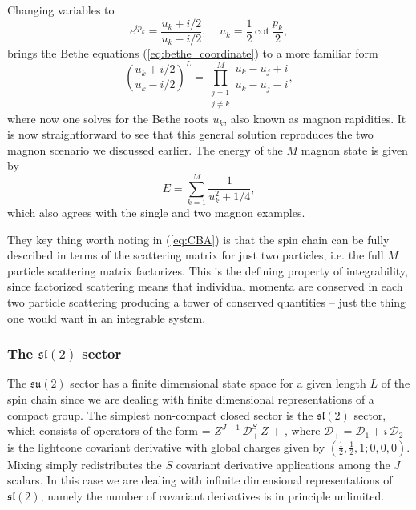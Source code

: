 Changing variables to
\begin{equation}
	\label{eq:up_param}
	e^{ip_k} = \frac{u_k + i/2}{u_k - i/2}, \;\;\;\; u_k = \frac{1}{2} \, \mathrm{cot} \, \frac{p_k}{2},
\end{equation}
brings the Bethe equations (\ref{eq:bethe_coordinate}) to a more familiar form
\begin{equation}
	\label{eq:su2_bae}
	\left( \frac{u_k + i/2}{u_k - i/2} \right)^L = \prod_{\substack{j=1 \\ j \neq k}}^M \frac{u_k - u_j + i}{u_k - u_j - i},
\end{equation}
where now one solves for the Bethe roots $u_k$, also known as magnon rapidities. 
It is now straightforward to see that this general solution reproduces the two magnon scenario we discussed earlier. 
The energy of the $M$ magnon state is given by
\begin{equation}
	E = \sum_{k=1}^M \frac{1}{u_k^2 + 1/4},
\end{equation}
 which also agrees with the single and two magnon examples. 
 
They key thing worth noting in (\ref{eq:CBA}) is that the spin chain can be fully described in terms of the scattering matrix for just two particles, i.e. the full $M$ particle scattering matrix factorizes.
This is the defining property of integrability, since factorized scattering means that individual momenta are conserved in each two particle scattering producing a tower of conserved quantities -- just the thing one would want in an integrable system. 
 
\subsubsection{The $\mathfrak{sl}(2)$ sector}
\label{sec:sl2_sector}

The $\mathfrak{su}(2)$ sector has a finite dimensional state space for a given length $L$ of the spin chain since we are dealing with finite dimensional representations of a compact group.
The simplest non-compact closed sector is the $\mathfrak{sl}(2)$ sector, which consists of operators of the form \cite{Beisert:2003yb}
\beq
	\label{eq:sl2_operators}
	 = \tr \( Z^{J-1} \, \mathcal{D}_+^S \, Z \) + ,
\eeq
where $\mathcal{D_+} = \mathcal{D}_1 + i\, \mathcal{D}_2$ is the lightcone covariant derivative with global charges given by $(\frac{1}{2},\frac{1}{2}, 1; 0,0,0)$. Mixing simply redistributes the $S$ covariant derivative applications among the $J$ scalars. In this case we are dealing with infinite dimensional representations of $\mathfrak{sl}(2)$, namely the number of covariant derivatives is in principle unlimited.

